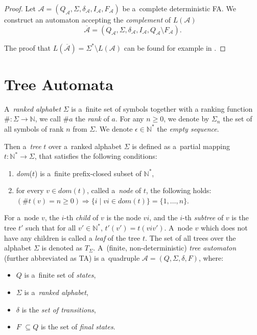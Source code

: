 	\begin{proof}
Let $\mathcal{A} = (Q_\mathcal{A}, \Sigma, \delta_\mathcal{A}, I_\mathcal{A},
F_\mathcal{A})$ be a~complete deterministic FA. We construct an automaton
accepting the \emph{complement} of $L(\mathcal{A})$ 
\begin{equation}
\overline{\mathcal{A}} =
(Q_\mathcal{A}, \Sigma, \delta_\mathcal{A}, I_\mathcal{A}, Q_\mathcal{A}
\setminus F_\mathcal{A}).
\end{equation}
	
The proof that $L(\overline{\mathcal{A}}) = \Sigma^* \setminus L(\mathcal{A})$
can be found for example in \cite{tin}.
 \end{proof}

 \section{Tree Automata}

 A~\emph{ranked alphabet} $\Sigma$ is a~finite set of symbols together with a
 ranking function $\#: \Sigma \to \mathbb{N}$, we call $\#a$ the \emph{rank}
 of $a$. For any $n \geq 0$, we denote by $\Sigma_n$ the set of all symbols of rank
 $n$ from $\Sigma$. We denote $\epsilon \in \mathbb{N}^*$ the \emph{empty
 sequence}.

Then a~\emph{tree} $t$ over a~ranked alphabet $\Sigma$ is defined as a~partial
mapping $t : \mathbb{N}^* \to \Sigma$, that satisfies the following conditions:
 \begin{enumerate}
  \item \emph{dom}($t$) is a~finite prefix-closed subset of $\mathbb{N}^*$,
  \item for every $v \in dom(t)$, called a~\emph{node} of $t$, the following
holds: $(\#t(v) = n \geq 0) \Longrightarrow \{i \mid vi \in dom(t)\} =
\{1,\ldots,n\}$.
 \end{enumerate}

For a~node $v$, the $i$-th \emph{child} of $v$ is the node $vi$, and the $i$-th
\emph{subtree} of $v$ is the tree $t'$ such that for all $v' \in \mathbb{N}^*$, 
$t'(v') = t(viv')$. A~node $v$ which does not have any children is called a
\emph{leaf} of the tree $t$. The set of all trees over the alphabet $\Sigma$ is
denoted as $T_\Sigma$.
\newpage
A~(finite, non-deterministic) \emph{tree automaton} (further abbreviated as TA)
is a~quadruple $\mathcal{A} = (Q, \Sigma, \delta, F)$, where:
 \begin{itemize}
   \item $Q$ is a~finite set of \emph{states},
	\item $\Sigma$ is a~\emph{ranked alphabet},
	\item $\delta$ is the \emph{set of transitions},
	\item $F$ $ \subseteq Q$ is the set of \emph{final states}.
 \end{itemize}

